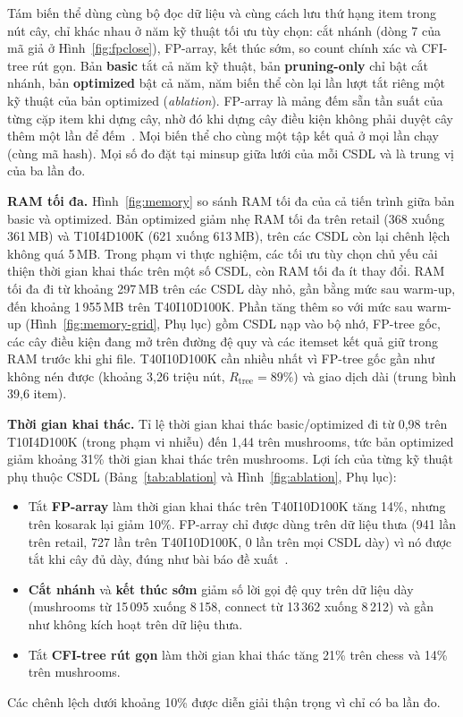 Tám biến thể dùng cùng bộ đọc dữ liệu và cùng cách lưu thứ hạng item trong nút cây, chỉ khác nhau ở năm kỹ thuật tối
ưu tùy chọn: cắt nhánh (dòng 7 của mã giả ở Hình~\ref{fig:fpclose}), FP-array, kết thúc sớm, so count chính xác và CFI-tree rút gọn. Bản
\textbf{basic} tắt cả năm kỹ thuật, bản \textbf{pruning-only} chỉ bật cắt nhánh, bản \textbf{optimized} bật cả năm, năm biến thể còn lại lần lượt tắt riêng một kỹ thuật của bản
optimized (\textit{ablation}). FP-array là mảng đếm sẵn tần suất của từng cặp item khi dựng cây, nhờ đó khi dựng cây
điều kiện không phải duyệt cây thêm một lần để đếm~\cite{grahne2005}. Mọi biến thể cho cùng một tập kết quả ở mọi lần
chạy (cùng mã hash). Mọi số đo đặt tại minsup giữa lưới của mỗi CSDL và là trung vị của ba lần đo.


\textbf{RAM tối đa.} Hình~\ref{fig:memory} so sánh RAM tối đa của cả tiến trình giữa bản basic và optimized. Bản
optimized giảm nhẹ RAM tối đa trên retail (368 xuống 361\,MB) và T10I4D100K (621 xuống 613\,MB), trên các CSDL còn lại
chênh lệch không quá 5\,MB. Trong phạm vi thực nghiệm, các tối ưu tùy chọn chủ yếu cải thiện thời gian khai thác trên
một số CSDL, còn RAM tối đa ít thay đổi. RAM tối đa đi từ khoảng 297\,MB trên các CSDL dày nhỏ, gần bằng mức sau
warm-up, đến khoảng 1\,955\,MB trên T40I10D100K. Phần tăng thêm so với mức sau warm-up (Hình~\ref{fig:memory-grid},
Phụ lục) gồm CSDL nạp vào bộ nhớ, FP-tree gốc, các cây điều kiện đang mở trên đường đệ quy và các itemset kết quả giữ
trong RAM trước khi ghi file. T40I10D100K cần nhiều nhất vì FP-tree gốc gần như không nén được (khoảng 3{,}26 triệu
nút, $R_{\text{tree}}=89\%$) và giao dịch dài (trung bình 39{,}6 item).

\textbf{Thời gian khai thác.} Tỉ lệ thời gian khai thác basic/optimized đi từ 0{,}98 trên T10I4D100K (trong phạm vi
nhiễu) đến 1{,}44 trên mushrooms, tức bản optimized giảm khoảng 31\% thời gian khai thác trên mushrooms. Lợi ích của
từng kỹ thuật phụ thuộc CSDL (Bảng~\ref{tab:ablation} và Hình~\ref{fig:ablation}, Phụ lục):
\begin{itemize}
  \item Tắt \textbf{FP-array} làm thời gian khai thác trên T40I10D100K tăng 14\%, nhưng trên kosarak lại giảm 10\%.
        FP-array chỉ được dùng trên dữ liệu thưa (941 lần trên retail, 727 lần trên T40I10D100K, 0 lần trên mọi CSDL
        dày) vì nó được tắt khi cây đủ dày, đúng như bài báo đề xuất~\cite{grahne2005}.
  \item \textbf{Cắt nhánh} và \textbf{kết thúc sớm} giảm số lời gọi đệ quy trên dữ liệu dày (mushrooms từ 15\,095
        xuống 8\,158, connect từ 13\,362 xuống 8\,212) và gần như không kích hoạt trên dữ liệu thưa.
  \item Tắt \textbf{CFI-tree rút gọn} làm thời gian khai thác tăng 21\% trên chess và 14\% trên mushrooms.
\end{itemize}
Các chênh lệch dưới khoảng 10\% được diễn giải thận trọng vì chỉ có ba lần đo.

